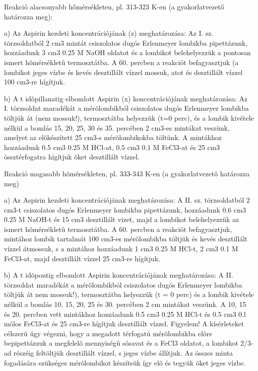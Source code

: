 \documentclass[a4paper, 12pt]{article}
\begin{document}
Reakció alacsonyabb hőmérsékleten, pl. 313-323 K-en (a gyakorlatvezető határozza meg):

a) Az Aspirin kezdeti koncentrációjának (z) meghatározása:
Az I. sz. törzsoldatból 2 cm3 mintát csiszolatos dugós Erlenmeyer lombikba pipettázunk, hozzáadunk 3 cm3 0.25 M NaOH oldatot és a lombikot belehelyezzük a pontosan ismert hõmérsékletû termosztátba. 
A 60. percben a reakciót befagyasztjuk (a lombikot jeges vízbe és kevés desztillált vízzel mossuk, atot és desztillált vízzel 100 cm3-re hígítjuk.


b) A t idõpillanatig elbomlott Aspirin (x) koncentrációjának meghatározása:
Az I. törzsoldat maradékát a mérõlombikból csiszolatos dugós Erlenmeyer lombikba töltjük át (nem mossuk!), termosztátba helyezzük (t=0 perc), és a lombik kivétele nélkül a bomlás 15, 20, 25, 30 és 35. percében 2 cm3-es mintákat veszünk, amelyet az elõkészített 25 cm3-s mérõlombikokba töltünk.
A mintákhoz hozzáadunk 0.5 cm3 0.25 M HCl-at, 0.5 cm3 0.1 M FeCl3-at és 25 cm3 össztérfogatra hígítjuk õket desztillált vízzel.


Reakció magasabb hõmérsékleten, pl. 333-343 K-en (a gyakorlatvezetõ határozza meg)


a) Az Aspirin kezdeti koncentrációjának meghatározása:
A II. sz. törzsoldatból 2 cm3-t csiszolatos dugós Erlenmeyer lombikba pipettázunk, hozzáadunk 0.6 cm3 0.25 M NaOH-t és 15 cm3 desztillált vizet, majd a lombikot belehelyezzük az ismert hõmérsékletû termosztátba.
A 60. percben a reakciót befagyasztjuk, mintához lombik tartalmát 100 cm3-es mérõlombikba töltjük és kevés desztillált vízzel átmossuk, s a mintához hozzáadunk 1 cm3 0.25 M HCl-t, 2 cm3 0.1 M FeCl3-at, majd desztillált vízzel 25 cm3-re hígítjuk.

b) A t idõpontig elbomlott Aspirin koncentrációjának meghatározása:
A II. törzsoldat maradékát a mérõlombikból csiszolatos dugós Erlenmeyer lombikba töltjük át nem mossuk!), termosztátba helyezzük (t = 0 perc) és a lombik kivétele nélkül a bomlás 10, 15, 20, 25 és 30. percében 2 cm mintákat veszünk.
A 10, 15 és 20. percben vett mintákhoz hozzáadunk 0.5 cm3 0.25 M HCl-t és 0.5 cm3 0.l mólos FeCl3-at és 25 cm3-re hígítjuk desztillált vízzel.
Figyelem!
A kísérleteket célszerû úgy végezni, hogy a megadott térfogatú mérõlombikba elõre bepipettázzuk a megfelelõ mennyiségû sósavat és a FeCl3 oldatot, a lombikot 2/3-ad részéig feltöltjük desztillált vízzel, s jeges vízbe állítjuk. 
Az összes minta fogadására szükséges mérõlombikot készítsük így elõ és tegyük õket jeges vízbe.
\end{document}
